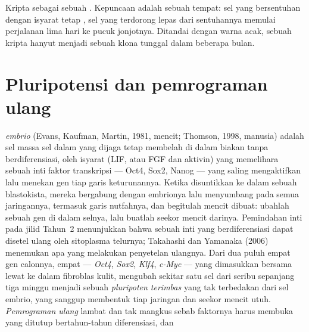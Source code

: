 \begin{omfigure}
{\small Kripta sebagai sebuah . Kepuncaan adalah sebuah tempat: sel yang bersentuhan dengan
isyarat  tetap , sel yang terdorong lepas dari sentuhannya
memulai perjalanan lima hari ke pucuk jonjotnya. Ditandai dengan warna
acak,  sebuah kripta hanyut menjadi sebuah klona tunggal dalam beberapa bulan.}
\end{omfigure}

\section{Pluripotensi dan pemrograman ulang}

\begin{definition}\label{def:b3:stem-cells:pluripotency}
%
\emph{ embrio} (Evans, Kaufman, Martin, 1981, mencit;
Thomson, 1998, manusia) adalah sel massa sel dalam yang dijaga tetap membelah di dalam
biakan tanpa berdiferensiasi, oleh isyarat (LIF, atau FGF dan aktivin)
yang memelihara sebuah inti faktor transkripsi --- Oct4, Sox2, Nanog ---
yang saling mengaktifkan lalu menekan gen tiap garis keturunannya.
Ketika disuntikkan ke dalam sebuah blastokista, mereka bergabung dengan embrionya lalu menyumbang pada semua
jaringannya, termasuk garis nutfahnya, dan begitulah mencit 
dibuat: ubahlah sebuah gen di dalam selnya, lalu buatlah seekor mencit darinya. Pemindahan
inti pada jilid Tahun~2 menunjukkan bahwa sebuah inti yang berdiferensiasi dapat
disetel ulang oleh sitoplasma telurnya; Takahashi dan Yamanaka (2006) menemukan apa yang
melakukan penyetelan ulangnya. Dari dua puluh empat gen calonnya, empat --- \emph{Oct4},
\emph{Sox2}, \emph{Klf4}, \emph{c-Myc} --- yang dimasukkan bersama lewat
 ke dalam fibroblas kulit, mengubah sekitar satu sel dari seribu
sepanjang tiga minggu menjadi sebuah \emph{ pluripoten terimbas}
yang tak terbedakan dari sel embrio, yang sanggup membentuk tiap jaringan dan
seekor mencit utuh. \emph{Pemrograman ulang} lambat dan tak mangkus sebab
faktornya harus membuka  yang ditutup bertahun-tahun diferensiasi, dan

\end{definition}
